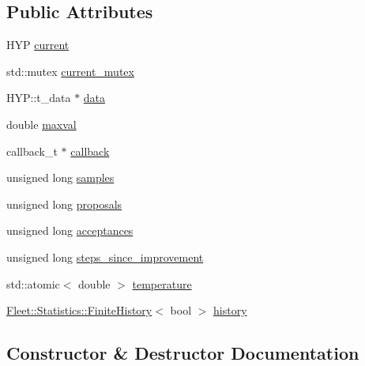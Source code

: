 \subsection*{Public Attributes}
\begin{DoxyCompactItemize}
\item 
H\+YP \hyperlink{class_m_c_m_c_chain_ab0c3b31e96d1f703bb8cf55c0575b4bd}{current}
\item 
std\+::mutex \hyperlink{class_m_c_m_c_chain_a42c355121fce0476426a49d5498c38a1}{current\+\_\+mutex}
\item 
H\+Y\+P\+::t\+\_\+data $\ast$ \hyperlink{class_m_c_m_c_chain_a62ffa9a3d173a79c82f09174b58aebaf}{data}
\item 
double \hyperlink{class_m_c_m_c_chain_a3b8d31f47d75503321b432eeac0bb13b}{maxval}
\item 
callback\+\_\+t $\ast$ \hyperlink{class_m_c_m_c_chain_aa7a4a0d46ae2d9818c2f076f839badd7}{callback}
\item 
unsigned long \hyperlink{class_m_c_m_c_chain_a0d3ac649b04077cd0ffea236df560c91}{samples}
\item 
unsigned long \hyperlink{class_m_c_m_c_chain_aec2cdd6a3e25447c7f34e31d0d98dbcb}{proposals}
\item 
unsigned long \hyperlink{class_m_c_m_c_chain_ae1597e42074b2efb93ace3e40f1f7a45}{acceptances}
\item 
unsigned long \hyperlink{class_m_c_m_c_chain_aeac1cd63d13c397ba01cca35b605b786}{steps\+\_\+since\+\_\+improvement}
\item 
std\+::atomic$<$ double $>$ \hyperlink{class_m_c_m_c_chain_a7173287e1c0e681a9912a84c87320ece}{temperature}
\item 
\hyperlink{class_fleet_1_1_statistics_1_1_finite_history}{Fleet\+::\+Statistics\+::\+Finite\+History}$<$ bool $>$ \hyperlink{class_m_c_m_c_chain_a2595f417e0c9cc847ac1dd70ed8b0763}{history}
\end{DoxyCompactItemize}


\subsection{Constructor \& Destructor Documentation}
\mbox{\label{class_m_c_m_c_chain_a60b036bec195eaa5a8081b2b8cc18eed}} 
